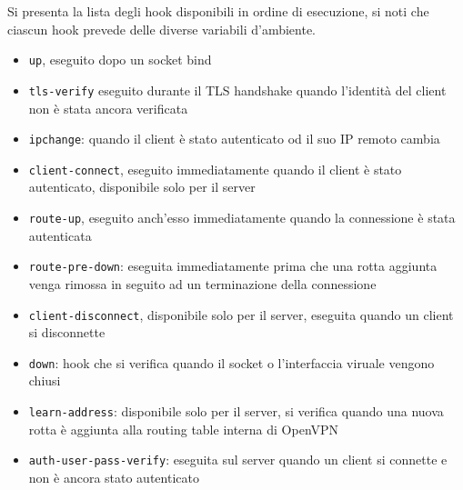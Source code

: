 Si presenta la lista degli hook disponibili in ordine di esecuzione, si noti che ciascun hook
prevede delle diverse variabili d'ambiente.
\begin{itemize}
	\item \texttt{up}, eseguito dopo un socket bind
	\item \texttt{tls-verify} eseguito durante il TLS handshake quando l'identità
	      del client non è stata ancora verificata
	\item \texttt{ipchange}: quando il client è stato autenticato od il suo IP remoto
	      cambia
	\item \texttt{client-connect}, eseguito immediatamente quando il client è stato
	      autenticato, disponibile solo per il server
	\item \texttt{route-up}, eseguito anch'esso immediatamente quando la connessione è stata
	      autenticata
	\item \texttt{route-pre-down}: eseguita immediatamente prima che una rotta aggiunta venga
	      rimossa in seguito ad un terminazione della connessione
	\item \texttt{client-disconnect}, disponibile solo per il server, eseguita quando
	      un client si disconnette
	\item \texttt{down}: hook che si verifica quando il socket o l'interfaccia viruale vengono
	      chiusi
	\item \texttt{learn-address}: disponibile solo per il server, si verifica quando una nuova rotta
	      è aggiunta alla routing table interna di OpenVPN
	\item \texttt{auth-user-pass-verify}: eseguita sul server quando un client si connette
	      e non è ancora stato autenticato
\end{itemize}

